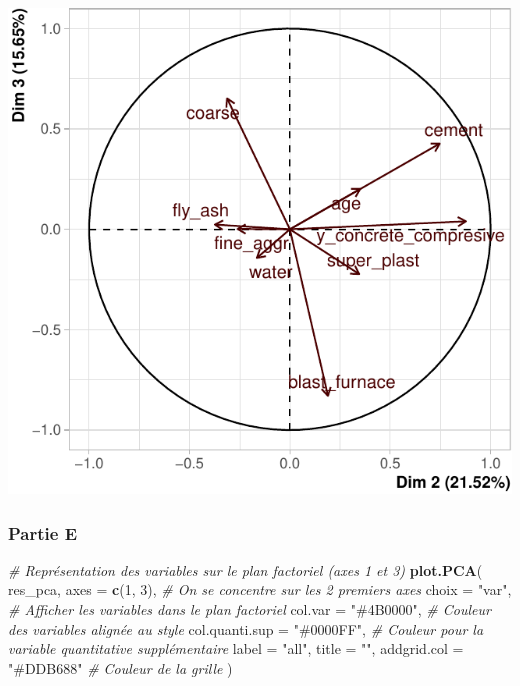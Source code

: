 \documentclass[
  12pt,
]{article}
\newenvironment{Shaded}{\begin{snugshade}}{\end{snugshade}}
\newcommand{\AttributeTok}[1]{\textcolor[rgb]{0.13,0.29,0.53}{#1}}
\newcommand{\CommentTok}[1]{\textcolor[rgb]{0.56,0.35,0.01}{\textit{#1}}}
\newcommand{\DecValTok}[1]{\textcolor[rgb]{0.00,0.00,0.81}{#1}}
\newcommand{\FunctionTok}[1]{\textcolor[rgb]{0.13,0.29,0.53}{\textbf{#1}}}
\newcommand{\NormalTok}[1]{#1}
\newcommand{\StringTok}[1]{\textcolor[rgb]{0.31,0.60,0.02}{#1}}
\begin{document}
\begin{center}\includegraphics{rmd_final_files/figure-latex/unnamed-chunk-25-1} \end{center}

\subsubsection{Partie E}\label{partie-e}

\begin{Shaded}
\begin{Highlighting}[]
\CommentTok{\# Représentation des variables sur le plan factoriel (axes 1 et 3)}
\FunctionTok{plot.PCA}\NormalTok{(}
\NormalTok{  res\_pca,}
  \AttributeTok{axes =} \FunctionTok{c}\NormalTok{(}\DecValTok{1}\NormalTok{, }\DecValTok{3}\NormalTok{),             }\CommentTok{\# On se concentre sur les 2 premiers axes}
  \AttributeTok{choix =} \StringTok{"var"}\NormalTok{,              }\CommentTok{\# Afficher les variables dans le plan factoriel}
  \AttributeTok{col.var =} \StringTok{"\#4B0000"}\NormalTok{,        }\CommentTok{\# Couleur des variables alignée au style}
  \AttributeTok{col.quanti.sup =} \StringTok{"\#0000FF"}\NormalTok{, }\CommentTok{\# Couleur pour la variable quantitative supplémentaire}
  \AttributeTok{label =} \StringTok{"all"}\NormalTok{,}
  \AttributeTok{title =} \StringTok{""}\NormalTok{,}
  \AttributeTok{addgrid.col =} \StringTok{"\#DDB688"}     \CommentTok{\# Couleur de la grille}
\NormalTok{)}
\end{Highlighting}
\end{Shaded}
\end{document}
